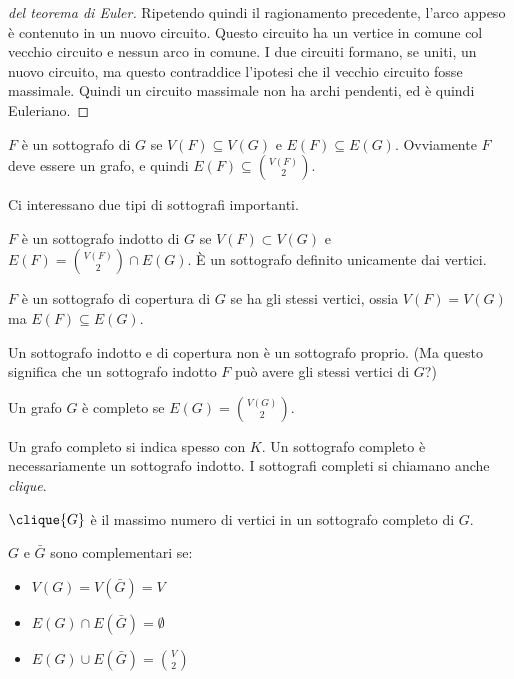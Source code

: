 \begin{proof}[del teorema di Euler]
	Ripetendo quindi il ragionamento precedente, l'arco appeso \`e contenuto in un nuovo circuito.
	Questo circuito ha un vertice in comune col vecchio circuito e nessun arco in comune.
	I due circuiti formano, se uniti, un nuovo circuito, ma questo contraddice l'ipotesi che il vecchio circuito fosse massimale.
	Quindi un circuito massimale non ha archi pendenti, ed \`e quindi Euleriano.
\end{proof}

\begin{defn}[Sottografo]
	$F$ \`e un sottografo di $G$ se $V(F) \subseteq V(G)$ e $E(F) \subseteq E(G)$.
	Ovviamente $F$ deve essere un grafo, e quindi $E(F) \subseteq \binom{V(F)}{2}$.
\end{defn}

Ci interessano due tipi di sottografi importanti.
\begin{defn}
	$F$ \`e un sottografo indotto di $G$ se $V(F) \subset V(G)$ e $E(F) = \binom{V(F)}{2} \cap E(G)$.
	\`E un sottografo definito unicamente dai vertici.
\end{defn}

\begin{defn}
	$F$ \`e un sottografo di copertura di $G$ se ha gli stessi vertici, ossia $V(F) = V(G)$ ma $E(F) \subseteq E(G)$.
\end{defn}
Un sottografo indotto e di copertura non \`e un sottografo proprio.
(Ma questo significa che un sottografo indotto $F$ pu\`o avere gli stessi vertici di $G$?)

\begin{defn}
	Un grafo $G$ \`e completo se $E(G) = \binom{V(G)}{2}$.
\end{defn}
Un grafo completo si indica spesso con $K$.
Un sottografo completo \`e necessariamente un sottografo indotto.
I sottografi completi si chiamano anche \emph{clique}.

$\clique{G}$ \`e il massimo numero di vertici in un sottografo completo di $G$.

\begin{defn}
	$G$ e $\bar{G}$ sono complementari se:
	\begin{itemize}
		\item $V(G) = V(\bar{G}) = V$
		\item $E(G) \cap E(\bar{G}) = \emptyset$
		\item $E(G) \cup E(\bar{G}) = \binom{V}{2}$
	\end{itemize}
\end{defn}

